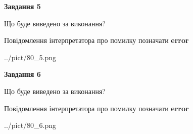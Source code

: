 \documentclass[12pt, ukrainian]{article}
\begin{document}
{{\begin {center}\textbf{Завдання 5}\end {center}}\par
Що буде виведено за виконання? \par
Повідомлення інтерпретатора про помилку позначати \textbf{error}

\begin{center}
	{../pict/80_5.png}
\end{center}
\newpage

{\begin {center}\textbf{Завдання 6}\end {center}}\par
Що буде виведено за виконання? \par
Повідомлення інтерпретатора про помилку позначати \textbf{error}

\begin{center}
	{../pict/80_6.png}
\end{center}
\newpage

}
\end{document}
